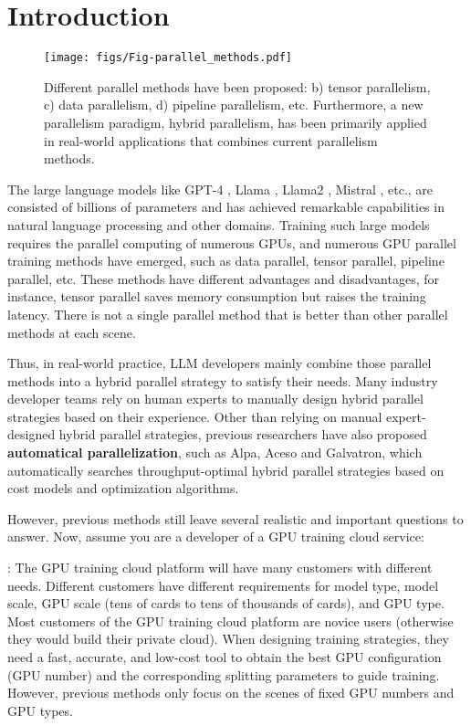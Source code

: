 \section{Introduction}

\begin{figure}[htb!]
\centering
\texttt{[image: figs/Fig-parallel\_methods.pdf]}
\caption{
Different parallel methods have been proposed: b) tensor parallelism, c) data parallelism, d) pipeline parallelism, etc.
Furthermore, a new parallelism paradigm, hybrid parallelism, has been primarily applied in real-world applications that combines current parallelism methods.
}
\label{fig:parallel}
\end{figure}

The large language models like GPT-4 \cite{achiam2023gpt}, Llama \cite{touvron2023llama}, Llama2 \cite{touvron2023llama2}, Mistral \cite{jiang2023mistral}, etc., are consisted of billions of parameters and has achieved remarkable capabilities in natural language processing and other domains.
Training such large models requires the parallel computing of numerous GPUs, and numerous GPU parallel training methods have emerged, such as data parallel, tensor parallel, pipeline parallel, etc.
These methods have different advantages and disadvantages, for instance, tensor parallel saves memory consumption but raises the training latency.
There is not a single parallel method that is better than other parallel methods at each scene.


Thus, in real-world practice, LLM developers mainly combine those parallel methods into a hybrid parallel strategy to satisfy their needs.
Many industry developer teams rely on human experts to manually design hybrid parallel strategies based on their experience.
Other than relying on manual expert-designed hybrid parallel strategies, previous researchers have also proposed \textbf{automatical parallelization}, such as Alpa\cite{zheng2022alpa}, Aceso \cite{liu2024aceso} and Galvatron\cite{miao2022galvatron}, which automatically searches throughput-optimal hybrid parallel strategies based on cost models and optimization algorithms. 

However, previous methods still leave several realistic and important questions to answer.
Now, assume you are a developer of a GPU training cloud service:

: The GPU training cloud platform will have many customers with different needs.
Different customers have different requirements for model type, model scale, GPU scale (tens of cards to tens of thousands of cards), and GPU type.
Most customers of the GPU training cloud platform are novice users (otherwise they would build their private cloud).
When designing training strategies, they need a fast, accurate, and low-cost tool to obtain the best GPU configuration (GPU number) and the corresponding splitting parameters to guide training.
However, previous methods only focus on the scenes of fixed GPU numbers and GPU types.

